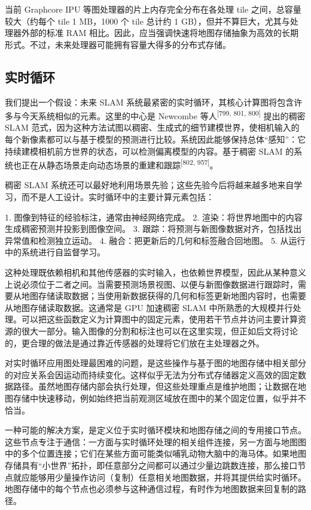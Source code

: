 当前 Graphcore IPU 等图处理器的片上内存完全分布在各处理 tile 之间，总容量较大（约每个 tile 1 MB，1000 个 tile 总计约 1 GB），但并不算巨大，尤其与处理器外部的标准 RAM 相比。因此，应当强调快速将地图存储抽象为高效的长期形式。不过，未来处理器可能拥有容量大得多的分布式存储。

\subsection{实时循环}

我们提出一个假设：未来 SLAM 系统最紧密的实时循环，其核心计算图将包含许多与今天系统相似的元素。这里的中心是 Newcombe 等人\textsuperscript{[799, 801, 800]} 提出的稠密 SLAM 范式，因为这种方法试图以稠密、生成式的细节建模世界，使相机输入的每个新像素都可以与基于模型的预测进行比较。系统因此能够保持总体“感知”：它持续建模相机前方世界的状态，可以检测偏离模型的内容。基于稠密 SLAM 的系统也正在从静态场景走向动态场景的重建和跟踪\textsuperscript{[802, 957]}。

稠密 SLAM 系统还可以最好地利用场景先验；这些先验今后将越来越多地来自学习，而不是人工设计。实时循环中的主要计算元素包括：

1. 图像到特征的经验标注，通常由神经网络完成。
2. 渲染：将世界地图中的内容生成稠密预测并投影到图像空间。
3. 跟踪：将预测与新图像数据对齐，包括找出异常值和检测独立运动。
4. 融合：把更新后的几何和标签融合回地图。
5. 从运行中的系统进行自监督学习。

这种处理既依赖相机和其他传感器的实时输入，也依赖世界模型，因此从某种意义上说必须位于二者之间。当需要预测场景视图、以便与新图像数据进行跟踪时，需要从地图存储读取数据；当使用新数据获得的几何和标签更新地图内容时，也需要从地图存储读取数据。这通常是 GPU 加速稠密 SLAM 中所熟悉的大规模并行处理。可以把这些函数定义为计算图中的固定元素，使用若干节点并访问主要计算资源的很大一部分。输入图像的分割和标注也可以在这里实现，但正如后文将讨论的，更合理的做法是通过靠近传感器的处理将它们放在主处理器之外。

对实时循环应用图处理最困难的问题，是这些操作与基于图的地图存储中相关部分的对应关系会因运动而持续变化。这样似乎无法为分布式存储器定义高效的固定数据路径。虽然地图存储内部会执行处理，但这些处理重点是维护地图；让数据在地图存储中快速移动，例如始终把当前观测区域放在图中的某个固定位置，似乎并不恰当。

一种可能的解决方案，是定义位于实时循环模块和地图存储之间的专用接口节点。这些节点专注于通信：一方面与实时循环处理的相关组件连接，另一方面与地图图中的多个位置连接；它们在某些方面可能类似哺乳动物大脑中的海马体。如果地图存储具有“小世界”拓扑，即任意部分之间都可以通过少量边跳数连接，那么接口节点就应能够用少量操作访问（复制）任意相关地图数据，并将其提供给实时循环。地图存储中的每个节点也必须参与这种通信过程，有时作为地图数据来回复制的路径。

